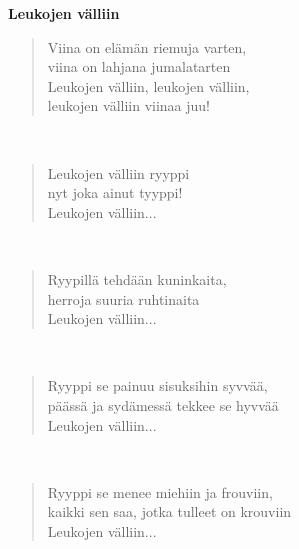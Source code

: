 %
%
\noindent\begin{minipage}{\linewidth}
\vspace{5pt}
\parbox[t]{0.85\linewidth}{\raggedright {\large\bf Leukojen välliin}\\[6pt]}
\begin{verse}
	Viina on elämän riemuja varten,\\
	viina on lahjana jumalatarten\\
	Leukojen välliin, leukojen välliin,\\
	leukojen välliin viinaa juu!\\
\end{verse}
\end{minipage}\\[10pt]
\noindent\begin{minipage}{\linewidth}
\begin{verse}
	Leukojen välliin ryyppi\\
	nyt joka ainut tyyppi!\\
	Leukojen välliin...\\
\end{verse}
\end{minipage}\\[10pt]
\noindent\begin{minipage}{\linewidth}
\begin{verse}
	Ryypillä tehdään kuninkaita,\\
	herroja suuria ruhtinaita\\
	Leukojen välliin...\\
\end{verse}
\end{minipage}\\[10pt]
\noindent\begin{minipage}{\linewidth}
\begin{verse}
	Ryyppi se painuu sisuksihin syvvää,\\
	päässä ja sydämessä tekkee se hyvvää\\
	Leukojen välliin...\\
\end{verse}
\end{minipage}\\[10pt]
\noindent\begin{minipage}{\linewidth}
\begin{verse}
	Ryyppi se menee miehiin ja frouviin,\\
	kaikki sen saa, jotka tulleet on krouviin\\
	Leukojen välliin...\\
\end{verse}
\end{minipage}\\[10pt]

